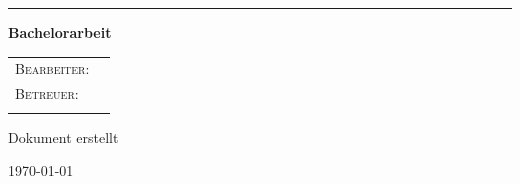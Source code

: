 \documentclass{article}
\begin{document}


\let\oldcontentsname\contentsname
\renewcommand{\contentsname}{\centering\small\oldcontentsname}

\title{\thesistitle}
\author{\authorA {} \authorB}
\date{\today}

\begin{titlepage}
	\centering
    \BgThispage
    \vspace*{-\topmargin}\vspace{-1in}%
    \vspace*{-\headheight}\vspace{-\headsep}%
    \vspace*{-\topskip}%
    \hspace*{-\oddsidemargin}
    \hspace*{-\marginparsep}
    \hspace*{-\marginparwidth}
	\vspace*{1.75cm}
	\par
    {\huge\bfseries\thesistitle\par}
    \noindent\rule{\textwidth}{0.3pt} 
    {\LARGE\bfseries Bachelorarbeit \par}
	\vspace*{1.75cm}
	\large \begin{tabular}{ l l }
	  \textsc{Bearbeiter}:&{\thesisauthor}
	  \\
	  \textsc{Betreuer:}&{\supervisor}\\
	  \\
	\end{tabular}
	\par
	\vspace*{1.75cm}
	\begin{otherlanguage}{ngerman}
		{\large Dokument erstellt\par\today\par}
	\end{otherlanguage}
	\newpage
	\thispagestyle{empty}
	\mbox{}
	\newpage
\end{titlepage}
\cleardoublepage
\end{document}
